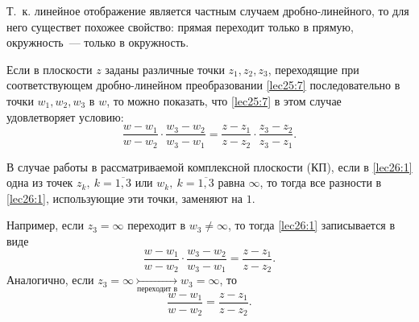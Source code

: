\documentclass[../../main.tex]{subfiles}
\begin{document}
Т.~к. линейное отображение
является частным случаем дробно-линейного, то для него существет
похожее свойство: прямая переходит только в прямую,
окружность~--- только в окружность.

Если в плоскости \textcircled{$z$} заданы различные точки $z_1, z_2, z_3$,
переходящие при соответствующем дробно-линейном преобразовании 
\eqref{lec25:7} последовательно в точки $w_1, w_2, w_3$ в 
\textcircled{$w$}, то можно показать, что \eqref{lec25:7} в этом случае
удовлетворяет условию:
\begin{equation}
\label{lec26:1} \frac{w - w_1}{w - w_2} \cdot \frac{w_3 - w_2}{w_3 - w_1} = 
\frac{z - z_1}{z - z_2} \cdot \frac{z_3 - z_2}{z_3 - z_1}.
\end{equation}

В случае работы в рассматриваемой комплексной плоскости (КП), если в 
\eqref{lec26:1} одна из точек
$z_k ,\ k = \overline{1,3}$ или $w_k ,\ k = \overline{1,3}$ равна 
$\infty$, то тогда все разности в \eqref{lec26:1}, использующие 
эти точки, заменяют на $1$.

Например, если $z_3 = \infty$ переходит в $w_3 \neq \infty$, то тогда 
\eqref{lec26:1} записывается в виде
\[
\frac{w - w_1}{w - w_2} \cdot \frac{w_3 - w_2}{w_3 - w_1} = 
\frac{z - z_1}{z - z_2}.
\]
Аналогично, если 
$z_3 = \infty \underset{\text{переходит в}}{\rightarrowtail} w_3 = \infty$, то
\[
\frac{w - w_1}{w - w_2} = \frac{z - z_1}{z - z_2}.
\]
\end{document}
